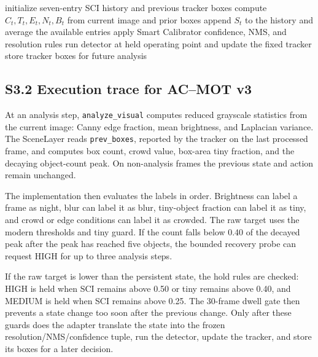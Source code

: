 \documentclass[11pt]{article}
\begin{document}
\begin{algorithm}[ht]
\caption{Preliminary heuristic prototype controller}
\label{alg:s3-original}
\begin{algorithmic}[1]
\State initialize seven-entry SCI history and previous tracker boxes
\State compute $C_t,T_t,E_t,N_t,B_t$ from current image and prior boxes
\State append $S_t$ to the history and average the available entries
\State apply Smart Calibrator confidence, NMS, and resolution rules
\EndIf
\State run detector at held operating point and update the fixed tracker
\State store tracker boxes for future analysis
\EndFor
\end{algorithmic}
\end{algorithm}

\subsection*{S3.2 Execution trace for AC--MOT v3}
At an analysis step, \texttt{analyze\_visual} computes reduced grayscale
statistics from the current image: Canny edge fraction, mean brightness, and
Laplacian variance. The SceneLayer reads \texttt{prev\_boxes}, reported by the
tracker on the last processed frame, and computes box count, crowd value,
box-area tiny fraction, and the decaying object-count peak. On non-analysis
frames the previous state and action remain unchanged.

The implementation then evaluates the labels in order. Brightness can label a
frame as night, blur can label it as blur, tiny-object fraction can label it as
tiny, and crowd or edge conditions can label it as crowded. The raw target uses
the modern thresholds and tiny guard. If the count falls below 0.40 of the
decayed peak after the peak has reached five objects, the bounded recovery probe
can request HIGH for up to three analysis steps.

If the raw target is lower than the persistent state, the hold rules are
checked: HIGH is held when SCI remains above 0.50 or tiny remains above 0.40,
and MEDIUM is held when SCI remains above 0.25. The 30-frame dwell gate then
prevents a state change too soon after the previous change. Only after these
guards does the adapter translate the state into the frozen
resolution/NMS/confidence tuple, run the detector, update the tracker, and store
its boxes for a later decision.
\end{document}
